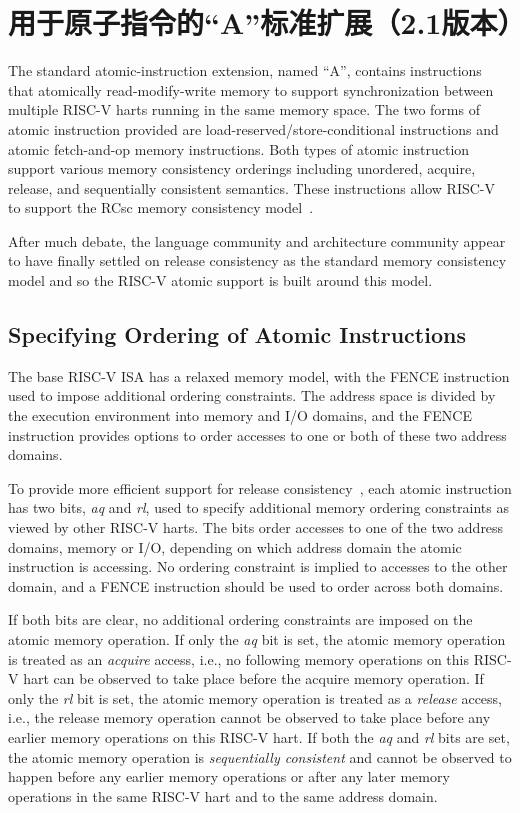 \chapter{用于原子指令的“A”标准扩展（2.1版本）}
\label{atomics}

The standard atomic-instruction extension, named ``A'',
contains instructions that atomically
read-modify-write memory to support synchronization between multiple
RISC-V harts running in the same memory space.  The two forms of
atomic instruction provided are load-reserved/store-conditional
instructions and atomic fetch-and-op memory instructions.  Both types
of atomic instruction support various memory consistency orderings
including unordered, acquire, release, and sequentially consistent
semantics.  These instructions allow RISC-V to support the RCsc memory
consistency model~\cite{Gharachorloo90memoryconsistency}.

\begin{commentary}
After much debate, the language community and architecture community
appear to have finally settled on release consistency as the standard
memory consistency model and so the RISC-V atomic support is built
around this model.
\end{commentary}

\section{Specifying Ordering of Atomic Instructions}

The base RISC-V ISA has a relaxed memory model, with the FENCE
instruction used to impose additional ordering constraints.  The
address space is divided by the execution environment into memory and
I/O domains, and the FENCE instruction provides options to order
accesses to one or both of these two address domains.

To provide more efficient support for release
consistency~\cite{Gharachorloo90memoryconsistency}, each atomic
instruction has two bits, {\em aq} and {\em rl}, used to specify
additional memory ordering constraints as viewed by other RISC-V
harts.  The bits order accesses to one of the two address domains,
memory or I/O, depending on which address domain the atomic
instruction is accessing.  No ordering constraint is implied to
accesses to the other domain, and a FENCE instruction should be used
to order across both domains.

If both bits are clear, no additional ordering constraints are imposed
on the atomic memory operation.  If only the {\em aq} bit is set, the
atomic memory operation is treated as an {\em acquire} access, i.e.,
no following memory operations on this RISC-V hart can be observed
to take place before the acquire memory operation.  If only the {\em
  rl} bit is set, the atomic memory operation is treated as a {\em
  release} access, i.e., the release memory operation cannot be
observed to take place before any earlier memory operations on this
RISC-V hart.  If both the {\em aq} and {\em rl} bits are set, the
atomic memory operation is {\em sequentially consistent} and cannot be
observed to happen before any earlier memory operations or after any
later memory operations in the same RISC-V hart and to the same
address domain.

